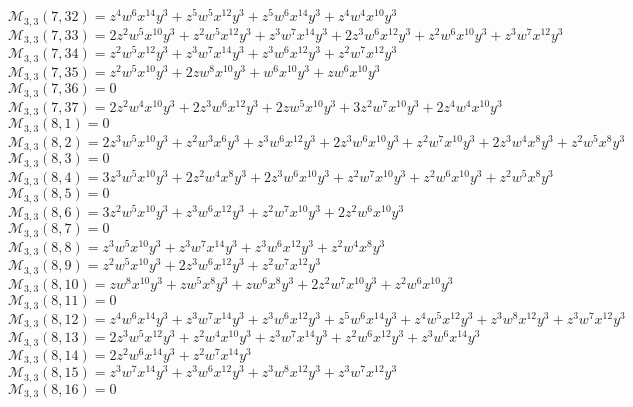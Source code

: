 $\mathcal{M}_{3,3}(7,32)=z^4w^6x^{14}y^3+z^5w^5x^{12}y^3+z^5w^6x^{14}y^3+z^4w^4x^{10}y^3$\\
$\mathcal{M}_{3,3}(7,33)=2z^2w^5x^{10}y^3+z^2w^5x^{12}y^3+z^3w^7x^{14}y^3+2z^3w^6x^{12}y^3+z^2w^6x^{10}y^3+z^3w^7x^{12}y^3$\\
$\mathcal{M}_{3,3}(7,34)=z^2w^5x^{12}y^3+z^3w^7x^{14}y^3+z^3w^6x^{12}y^3+z^2w^7x^{12}y^3$\\
$\mathcal{M}_{3,3}(7,35)=z^2w^5x^{10}y^3+2zw^8x^{10}y^3+w^6x^{10}y^3+zw^6x^{10}y^3$\\
$\mathcal{M}_{3,3}(7,36)=0$\\
$\mathcal{M}_{3,3}(7,37)=2z^2w^4x^{10}y^3+2z^3w^6x^{12}y^3+2zw^5x^{10}y^3+3z^2w^7x^{10}y^3+2z^4w^4x^{10}y^3$\\
$\mathcal{M}_{3,3}(8,1)=0$\\
$\mathcal{M}_{3,3}(8,2)=2z^3w^5x^{10}y^3+z^2w^3x^6y^3+z^3w^6x^{12}y^3+2z^3w^6x^{10}y^3+z^2w^7x^{10}y^3+2z^3w^4x^8y^3+z^2w^5x^8y^3$\\
$\mathcal{M}_{3,3}(8,3)=0$\\
$\mathcal{M}_{3,3}(8,4)=3z^3w^5x^{10}y^3+2z^2w^4x^8y^3+2z^3w^6x^{10}y^3+z^2w^7x^{10}y^3+z^2w^6x^{10}y^3+z^2w^5x^8y^3$\\
$\mathcal{M}_{3,3}(8,5)=0$\\
$\mathcal{M}_{3,3}(8,6)=3z^2w^5x^{10}y^3+z^3w^6x^{12}y^3+z^2w^7x^{10}y^3+2z^2w^6x^{10}y^3$\\
$\mathcal{M}_{3,3}(8,7)=0$\\
$\mathcal{M}_{3,3}(8,8)=z^3w^5x^{10}y^3+z^3w^7x^{14}y^3+z^3w^6x^{12}y^3+z^2w^4x^8y^3$\\
$\mathcal{M}_{3,3}(8,9)=z^2w^5x^{10}y^3+2z^3w^6x^{12}y^3+z^2w^7x^{12}y^3$\\
$\mathcal{M}_{3,3}(8,10)=zw^8x^{10}y^3+zw^5x^8y^3+zw^6x^8y^3+2z^2w^7x^{10}y^3+z^2w^6x^{10}y^3$\\
$\mathcal{M}_{3,3}(8,11)=0$\\
$\mathcal{M}_{3,3}(8,12)=z^4w^6x^{14}y^3+z^3w^7x^{14}y^3+z^3w^6x^{12}y^3+z^5w^6x^{14}y^3+z^4w^5x^{12}y^3+z^3w^8x^{12}y^3+z^3w^7x^{12}y^3$\\
$\mathcal{M}_{3,3}(8,13)=2z^3w^5x^{12}y^3+z^2w^4x^{10}y^3+z^3w^7x^{14}y^3+z^2w^6x^{12}y^3+z^3w^6x^{14}y^3$\\
$\mathcal{M}_{3,3}(8,14)=2z^2w^6x^{14}y^3+z^2w^7x^{14}y^3$\\
$\mathcal{M}_{3,3}(8,15)=z^3w^7x^{14}y^3+z^3w^6x^{12}y^3+z^3w^8x^{12}y^3+z^3w^7x^{12}y^3$\\
$\mathcal{M}_{3,3}(8,16)=0$\\
